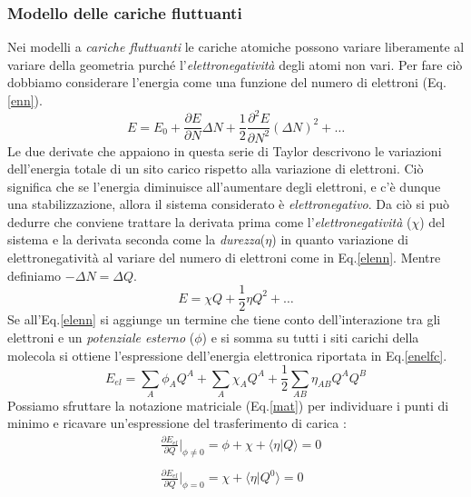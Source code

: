 \documentclass[oneside]{amsbook}
\numberwithin{section}{chapter}
\numberwithin{equation}{section}
\numberwithin{figure}{section}
\begin{document}
\subsubsection{Modello delle cariche fluttuanti}
Nei modelli a \emph{cariche fluttuanti}  le cariche atomiche possono variare liberamente al variare della geometria purché l'\emph{elettronegatività} degli atomi non vari. Per fare ciò dobbiamo considerare l'energia come una funzione del numero di elettroni (Eq.\ref{enn}).
\begin{equation}
\label{enn}
E=E_0+\frac{\partial E}{\partial N} \Delta N + \frac{1}{2} \frac{\partial ^2 E}{\partial N ^2}(\Delta N)^2 + \ldots
\end{equation} 
Le due derivate che appaiono in questa serie di Taylor  descrivono le variazioni dell'energia totale di un sito carico rispetto alla variazione di elettroni. Ciò significa che se l'energia diminuisce all'aumentare degli elettroni, e c'è dunque una stabilizzazione, allora il sistema considerato è \emph{elettronegativo}. Da ciò si può dedurre che conviene trattare la derivata prima come l'\emph{elettronegatività} ($\chi$) del sistema e la derivata seconda come la \emph{durezza}($\eta$) in quanto variazione di elettronegatività al variare del numero di elettroni come in Eq.\ref{elenn}. Mentre definiamo $-\Delta N= \Delta Q$.
\begin{equation}
\label{elenn}
E=\chi Q + \frac{1}{2}\eta Q^2 +\ldots
\end{equation}
Se all'Eq.\ref{elenn} si aggiunge un termine che tiene conto dell'interazione tra gli elettroni e un \emph{potenziale esterno} ($\phi$) e si somma su tutti i siti carichi della molecola si ottiene l'espressione dell'energia elettronica  riportata in Eq.\ref{enelfc}.
\begin{equation}
\label{enelfc}
E_{el}= \sum \limits_A \phi_A Q^A + \sum \limits _A \chi_A Q^A + \frac{1}{2} \sum \limits _{AB} \eta_{AB} Q^A Q^B
\end{equation}
Possiamo sfruttare la notazione matriciale (Eq.\ref{mat}) per individuare i punti di minimo e ricavare un'espressione del trasferimento di carica :
\begin{equation}
\label{mat}
\begin{aligned}
&\frac{\partial E_{el}}{\partial Q} \biggr \rvert _{\phi \neq 0}= \phi + \chi+ \langle\eta\vert Q\rangle =0 \\ \\
&\frac{\partial E_{el}}{\partial Q} \biggr \rvert _{\phi = 0}= \chi+ \langle\eta\vert Q^0\rangle =0
\end{aligned}
\end{equation}
\end{document}
